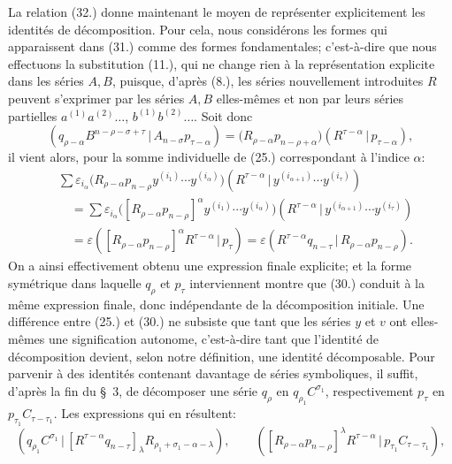 \documentclass[11pt]{article}
\newcommand{\pair}[2]{(#1\,|\,#2)}
\newcommand{\eps}{\varepsilon}
\begin{document}
La relation (32.) donne maintenant le moyen de représenter explicitement les identités de décomposition. Pour cela, nous considérons les formes qui apparaissent dans (31.) comme des formes fondamentales; c'est-à-dire que nous effectuons la substitution (11.), qui ne change rien à la représentation explicite dans les séries $A,B$, puisque, d'après (8.), les séries nouvellement introduites $R$ peuvent s'exprimer par les séries $A,B$ elles-mêmes et non par leurs séries partielles $a^{(1)}a^{(2)}\ldots$, $b^{(1)}b^{(2)}\ldots$. Soit donc
\begin{equation}
 \pair{q_{\rho-\alpha}B^{n-\rho-\sigma+\tau}}{A_{n-\sigma}p_{\tau-\alpha}}
 =\bigl(R_{\rho-\alpha}p_{n-\rho+\alpha}\bigr)
  \pair{R^{\tau-\alpha}}{p_{\tau-\alpha}},
\tag{33}
\end{equation}
il vient alors, pour la somme individuelle de (25.) correspondant à l'indice $\alpha$:
\begin{equation}
\begin{aligned}
&\sum \eps_{i_\alpha}\bigl(R_{\rho-\alpha}p_{n-\rho}y^{(i_1)}\cdots y^{(i_\alpha)}\bigr)
 \pair{R^{\tau-\alpha}}{y^{(i_{\alpha+1})}\cdots y^{(i_\tau)}}\\
&\quad=\sum \eps_{i_\alpha}\bigl([R_{\rho-\alpha}p_{n-\rho}]^\alpha y^{(i_1)}\cdots y^{(i_\alpha)}\bigr)
 \pair{R^{\tau-\alpha}}{y^{(i_{\alpha+1})}\cdots y^{(i_\tau)}}\\
&\quad=\eps\pair{[R_{\rho-\alpha}p_{n-\rho}]^\alpha R^{\tau-\alpha}}{p_\tau}
 =\eps\pair{R^{\tau-\alpha}q_{n-\tau}}{R_{\rho-\alpha}p_{n-\rho}}.
\end{aligned}
\tag{34}
\end{equation}
On a ainsi effectivement obtenu une expression finale explicite; et la forme symétrique dans laquelle $q_\rho$ et $p_\tau$ interviennent montre que (30.) conduit à la même expression finale, donc indépendante de la décomposition initiale. Une différence entre (25.) et (30.) ne subsiste que tant que les séries $y$ et $v$ ont elles-mêmes une signification autonome, c'est-à-dire tant que l'identité de décomposition devient, selon notre définition, une identité décomposable. Pour parvenir à des identités contenant davantage de séries symboliques, il suffit, d'après la fin du \S\ 3, de décomposer une série $q_\rho$ en $q_{\rho_1}C^{\sigma_1}$, respectivement $p_\tau$ en $p_{\tau_1}C_{\tau-\tau_1}$. Les expressions qui en résultent:
\begin{equation}
 \pair{q_{\rho_1}C^{\sigma_1}}{[R^{\tau-\alpha}q_{n-\tau}]_\lambda R_{\rho_1+\sigma_1-\alpha-\lambda}},
 \qquad
 \pair{[R_{\rho-\alpha}p_{n-\rho}]^\lambda R^{\tau-\alpha}}{p_{\tau_1}C_{\tau-\tau_1}},
\tag{35}
\end{equation}
\end{document}
